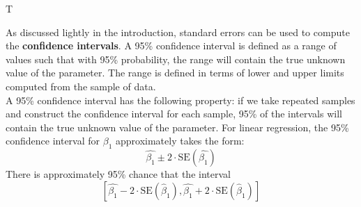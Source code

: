 T\documentclass{article}
\begin{document}
As discussed lightly in the introduction, standard errors can be used to compute the \textbf{confidence intervals}. A 95\% confidence interval is defined as a range of values such that with 95\% probability, the range will contain the true unknown value of the parameter. The range is defined in terms of lower and upper limits computed from the sample of data. 
\\ A 95\% confidence interval has the following property: if we take repeated samples and construct the confidence interval for each sample, 95\% of the intervals will contain the true unknown value of the parameter. For linear regression, the 95\% confidence interval for $\beta_1$ approximately takes the form: \begin{equation*} \hat{\beta_1} \pm 2\cdot\text{SE}(\hat{\beta_1})\end{equation*}
There is approximately 95\% chance that the interval 
\begin{equation*} \left[\hat{\beta_1} - 2\cdot \text{SE}(\hat\beta_1), \hat{\beta_1} + 2\cdot \text{SE}(\hat\beta_1)  \right] \end{equation*}
\end{document}
